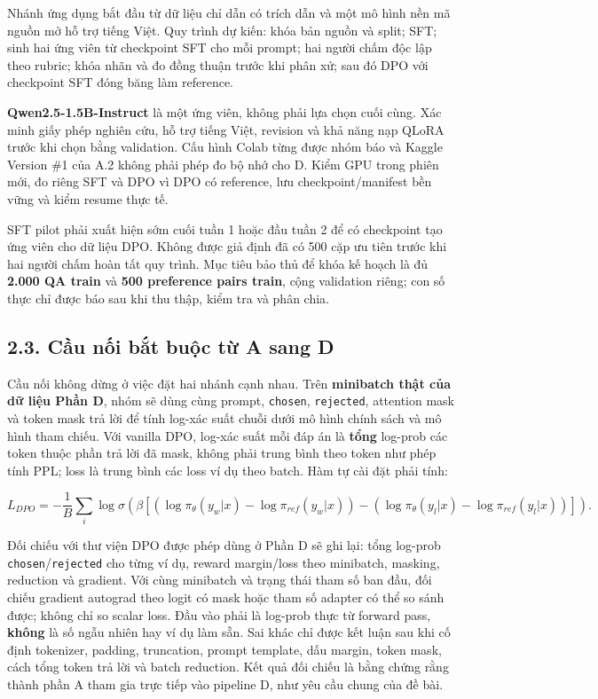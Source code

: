 \documentclass[11pt,a4paper]{article}
\begin{document}
Nhánh ứng dụng bắt đầu từ dữ liệu chỉ dẫn có trích dẫn và một mô hình
nền mã nguồn mở hỗ trợ tiếng Việt. Quy trình dự kiến: khóa bản nguồn và
split; SFT; sinh hai ứng viên từ checkpoint SFT cho mỗi prompt; hai
người chấm độc lập theo rubric; khóa nhãn và đo đồng thuận trước khi
phân xử; sau đó DPO với checkpoint SFT đóng băng làm reference.

\textbf{Qwen2.5-1.5B-Instruct} là một ứng viên, không phải lựa chọn cuối
cùng. Xác minh giấy phép nghiên cứu, hỗ trợ tiếng Việt, revision và khả
năng nạp QLoRA trước khi chọn bằng validation. Cấu hình Colab từng được
nhóm báo và Kaggle Version \#1 của A.2 không phải phép đo bộ nhớ cho D.
Kiểm GPU trong phiên mới, đo riêng SFT và DPO vì DPO có reference, lưu
checkpoint/manifest bền vững và kiểm resume thực tế.

SFT pilot phải xuất hiện sớm cuối tuần 1 hoặc đầu tuần 2 để có
checkpoint tạo ứng viên cho dữ liệu DPO. Không được giả định đã có 500
cặp ưu tiên trước khi hai người chấm hoàn tất quy trình. Mục tiêu bảo
thủ để khóa kế hoạch là đủ \textbf{2.000 QA train} và \textbf{500
preference pairs train}, cộng validation riêng; con số thực chỉ được báo
sau khi thu thập, kiểm tra và phân chia.

\subsection{2.3. Cầu nối bắt buộc từ A sang
D}\label{cux1ea7u-nux1ed1i-bux1eaft-buux1ed9c-tux1eeb-a-sang-d}

Cầu nối không dừng ở việc đặt hai nhánh cạnh nhau. Trên
\textbf{minibatch thật của dữ liệu Phần D}, nhóm sẽ dùng cùng prompt,
\nolinkurl{chosen}, \nolinkurl{rejected}, attention mask và token mask
trả lời để tính log-xác suất chuỗi dưới mô hình chính sách và mô hình
tham chiếu. Với vanilla DPO, log-xác suất mỗi đáp án là \textbf{tổng}
log-prob các token thuộc phần trả lời đã mask, không phải trung bình
theo token như phép tính PPL; loss là trung bình các loss ví dụ theo
batch. Hàm tự cài đặt phải tính:

\[L_{DPO}=-\frac{1}{B}\sum_i\log\sigma\left(\beta\left[(\log\pi_\theta(y_w|x)-\log\pi_{ref}(y_w|x))-(\log\pi_\theta(y_l|x)-\log\pi_{ref}(y_l|x))\right]\right).\]

Đối chiếu với thư viện DPO được phép dùng ở Phần D sẽ ghi lại: tổng
log-prob \nolinkurl{chosen}/\nolinkurl{rejected} cho từng ví dụ, reward
margin/loss theo minibatch, masking, reduction và gradient. Với cùng
minibatch và trạng thái tham số ban đầu, đối chiếu gradient autograd
theo logit có mask hoặc tham số adapter có thể so sánh được; không chỉ
so scalar loss. Đầu vào phải là log-prob thực từ forward pass,
\textbf{không} là số ngẫu nhiên hay ví dụ làm sẵn. Sai khác chỉ được kết
luận sau khi cố định tokenizer, padding, truncation, prompt template,
dấu margin, token mask, cách tổng token trả lời và batch reduction. Kết
quả đối chiếu là bằng chứng rằng thành phần A tham gia trực tiếp vào
pipeline D, như yêu cầu chung của đề bài.
\end{document}

